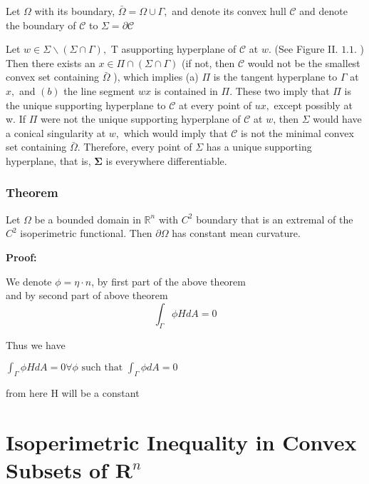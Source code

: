 \documentclass[oneside]{book}
\begin{document}
 Let $\Omega$ with its boundary,  $\bar{\Omega} =\Omega \cup \Gamma,$ and denote its convex hull  $\mathcal{C}$  and denote the boundary of $\mathcal{C}$  to $\Sigma=\partial \mathcal{C}$ 

Let $w \in \Sigma \backslash(\Sigma \cap \Gamma),$ T asupporting hyperplane of $\mathcal{C}$ at $w$. (See Figure II. $1.1 .$ ) Then there exists an $x \in \Pi \cap(\Sigma \cap \Gamma)$ (if not, then $\mathcal{C}$ would not be the smallest convex set containing $\bar{\Omega}$ ), which implies (a) $\Pi$ is the tangent hyperplane to $\Gamma$
at $x,$ and $(b)$ the line segment $w x$ is contained in $\Pi$. These two imply that $\Pi$ is the unique supporting hyperplane to $\mathcal{C}$ at every point of $u x,$ except possibly at
w. If $\Pi$ were not the unique supporting hyperplane of $\mathcal{C}$ at $w$, then $\Sigma$ would have a conical singularity at $w,$ which would imply that $\mathcal{C}$ is not the minimal convex set containing $\bar{\Omega}$. Therefore, every point of $\Sigma$ has a unique supporting hyperplane, that is, $\boldsymbol{\Sigma}$ is everywhere differentiable.



\subsection{Theorem}
 Let $\Omega$ be a bounded domain in $\mathbb{R}^{n}$ with $C^{2}$ boundary that is an extremal of the $C^{2}$ isoperimetric functional. Then  $\partial \Omega$ has constant mean curvature.

\textbf{Proof: }  

We denote 
$\phi = \eta\cdot{n}$,
by first part of the above theorem \\ 

and by second part of above theorem 
$$\int_{\Gamma} \phi H d A=0$$

Thus we have \\

\begin{center}
   $ \int_{\Gamma} \phi H d A=0 \forall \phi \text { such that } \int_{\Gamma} \phi d A=0$ \\ 
\end{center}
from here H will be a constant 

\chapter{Isoperimetric Inequality in Convex Subsets of $\mathbf{R}^{n}$ }
  
\end{document}
